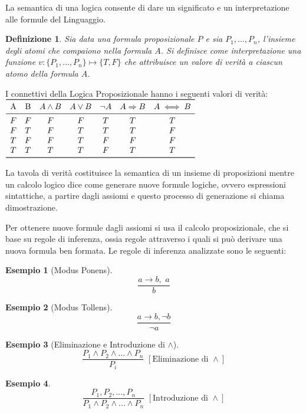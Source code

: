 \documentclass[a4paper]{report}
\newtheorem{defi}{Definizione}%
\newtheorem{esempio}{Esempio}
\begin{document}
La semantica di una logica consente di dare un significato e un interpretazione alle formule del Linguaggio.\newline
\begin{defi}
  Sia data una formula proposizionale $P$ e sia ${P_1,\dots,P_n}$, l'insieme degli atomi che compaiono nella formula $A$.
  Si definisce come \emph{interpretazione} una funzione $v:\{P_1,\dots,P_n\} \mapsto \{T,F\}$ che attribuisce un valore di verità
  a ciascun atomo della formula $A$.
\end{defi}
I connettivi della Logica Proposizionale hanno i seguenti valori di verità:
$\begin{array}{ccccccc}
\toprule
\text{A} & \text{B} & A \land B & A \lor B & \neg A & A \Rightarrow B & A \iff B \\
\midrule
    F & F & F & F & T & T & T \\
    F & T & F & T & T & T & F \\
    T & F & F & T & F & F & F \\
    T & T & T & T & F & T & T \\
\bottomrule
\end{array}$\newline

La tavola di verità costituisce la semantica di un insieme di proposizioni mentre un calcolo logico dice come generare nuove formule logiche,
ovvero espressioni sintattiche, a partire dagli assiomi e questo processo di generazione si chiama dimostrazione.

Per ottenere nuove formule dagli assiomi si usa il calcolo proposizionale, che si base su regole di inferenza, ossia regole attraverso
i quali si può derivare una nuova formula ben formata.\newline
Le regole di inferenza analizzate sono le seguenti:
\begin{esempio}[Modus Ponens]
$$\frac{a\to b,\,\,a}{b}$$
\end{esempio}

\begin{esempio}[Modus Tollens]
$$\frac{a\to b, \neg b}{\neg a}$$
\end{esempio}

\begin{esempio}[Eliminazione e Introduzione di $\land$]
$$\frac{P_1\land P_2 \land ... \land P_n}{P_i}\,\,[\mbox{Eliminazione di }\land]$$
\end{esempio}

\begin{esempio}
$$\frac{P_1, P_2,...,P_n}{P_1\land P_2 \land ... \land P_n}\,\,[\mbox{Introduzione di }\land]$$
\end{esempio}
\end{document}

